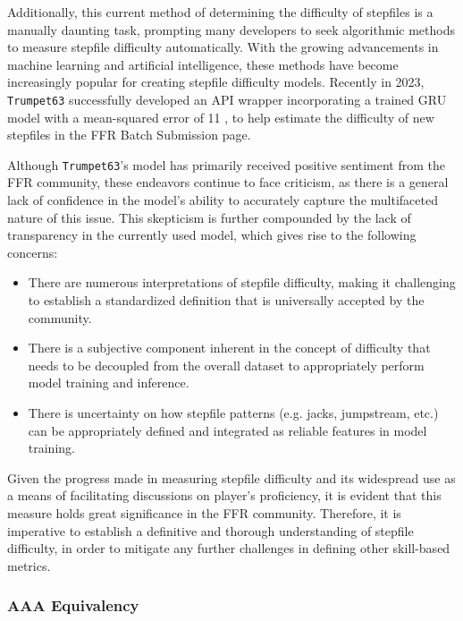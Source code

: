 Additionally, this current method of determining the difficulty of stepfiles is a manually daunting task, prompting many developers to seek algorithmic methods to measure stepfile difficulty automatically. With the growing advancements in machine learning and artificial intelligence, these methods have become increasingly popular for creating stepfile difficulty models. Recently in 2023, \texttt{Trumpet63} successfully developed an API wrapper incorporating a trained GRU model with a mean-squared error of 11 \cite{20230216}, to help estimate the difficulty of new stepfiles in the FFR Batch Submission page.

\vspace{2mm}

Although \texttt{Trumpet63}’s model has primarily received positive sentiment from the FFR community, these endeavors continue to face criticism, as there is a general lack of confidence in the model’s ability to accurately capture the multifaceted nature of this issue. This skepticism is further compounded by the lack of transparency in the currently used model, which gives rise to the following concerns:

\begin{itemize}
	\item There are numerous interpretations of stepfile difficulty, making it challenging to establish a standardized definition that is universally accepted by the community.
	\item There is a subjective component inherent in the concept of difficulty that needs to be decoupled from the overall dataset to appropriately perform model training and inference.
	\item There is uncertainty on how stepfile patterns (e.g. jacks, jumpstream, etc.) can be appropriately defined and integrated as reliable features in model training. 
\end{itemize}

Given the progress made in measuring stepfile difficulty and its widespread use as a means of facilitating discussions on player's proficiency, it is evident that this measure holds great significance in the FFR community. Therefore, it is imperative to establish a definitive and thorough understanding of stepfile difficulty, in order to mitigate any further challenges in defining other skill-based metrics.

\subsubsection{AAA Equivalency}


